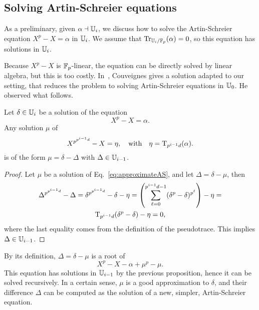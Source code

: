 
\subsection{Solving Artin-Schreier equations} 

As a preliminary, given $\alpha\dashv \mathbb{U}_i$, we discuss how to
solve the Artin-Schreier equation $X^p-X=\alpha$ in $\mathbb{U}_i$. We assume
that $\operatorname{Tr}_{\mathbb{U}_i/\mathbb{F}_p}(\alpha)=0$, so this equation has solutions in
$\mathbb{U}_i$.

Because $X^p-X$ is $\mathbb{F}_p$-linear, the equation can be directly solved
by linear algebra, but this is too costly. In~\cite{couveignes00},
Couveignes gives a solution adapted to our setting, that reduces the
problem to solving Artin-Schreier equations in $\mathbb{U}_0$. He observed
what follows.

\begin{proposition}
  Let $\delta\in\mathbb{U}_i$ be a solution of the equation 
  \begin{equation}
    \label{eq:106}
    X^p - X = \alpha
    \text{.}    
  \end{equation}
  Any solution $\mu$ of
  \begin{equation}
    \label{eq:approximateAS}
    X^{p^{p^{i-1}d}} - X = \eta, \quad\text{with}\quad \eta=\operatorname{T}_{p^{i-1}d}(\alpha).
  \end{equation}
  is of the form $\mu=\delta - \Delta$ with $\Delta\in\mathbb{U}_{i-1}$.
\end{proposition}
\begin{proof}
  Let $\mu$ be a solution of Eq.~\eqref{eq:approximateAS}, and let
  $\Delta=\delta-\mu$, then
  \begin{multline}
    \label{eq:108}
    \Delta^{p^{p^{i-1}d}} - \Delta = \delta^{p^{p^{i-1}d}} - \delta - \eta =
    \left(\sum_{\ell=0}^{p^{i-1}d-1}(\delta^{p}-\delta)^{p^\ell}\right) - \eta =\\
    \operatorname{T}_{p^{i-1}d}(\delta^p-\delta) - \eta = 0
    \text{,}
  \end{multline}
  where the last equality comes from the definition of the
  pseudotrace. This implies $\Delta\in\mathbb{U}_{i-1}$.
\end{proof}

By its definition, $\Delta=\delta-\mu$ is a root of
\begin{equation}
  \label{eq:approximant}
  X^p-X-\alpha+\mu^p-\mu.
\end{equation}
This equation has solutions in $\mathbb{U}_{i-1}$ by the previous proposition,
hence it can be solved recursively. In a certain sense, $\mu$ is a
good approximation to $\delta$, and their difference $\Delta$ can be
computed as the solution of a new, simpler, Artin-Schreier equation.


